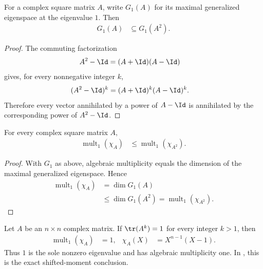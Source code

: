 \begin{lemma}
    \label{thm:mpu_generalized_eigenspace_one_square}
    \leanok
    For a complex square matrix $A$, write $G_1(A)$ for its maximal generalized
    eigenspace at the eigenvalue $1$. Then
    \begin{align}
        G_1(A) & \subseteq G_1(A^2).
    \end{align}
\end{lemma}

\begin{proof}\leanok
    The commuting factorization
    \begin{align}
        A^2-\Id & =(A+\Id)(A-\Id)
    \end{align}
    gives, for every nonnegative integer $k$,
    \begin{align}
        (A^2-\Id)^k & =(A+\Id)^k(A-\Id)^k.
    \end{align}
    Therefore every vector annihilated by a power of $A-\Id$ is annihilated by
    the corresponding power of $A^2-\Id$.
\end{proof}

\begin{lemma}
    \label{thm:mpu_root_multiplicity_one_square}
    \leanok
    For every complex square matrix $A$,
    \begin{align}
        \operatorname{mult}_{1}(\chi_A)
         & \le \operatorname{mult}_{1}(\chi_{A^2}).
    \end{align}
\end{lemma}

\begin{proof}\leanok
    With $G_1$ as above, algebraic multiplicity equals the dimension of the
    maximal generalized eigenspace. Hence
    \begin{align}
        \operatorname{mult}_{1}(\chi_A)
         & =\dim G_1(A)     \\
         & \le\dim G_1(A^2)
        =\operatorname{mult}_{1}(\chi_{A^2}).
    \end{align}
\end{proof}

\begin{lemma}
    \label{thm:mpu_shifted_trace_power_charpoly}
    \leanok
    Let $A$ be an $n\times n$ complex matrix. If $\tr(A^k)=1$ for every
    integer $k>1$, then
    \begin{align}
        \operatorname{mult}_{1}(\chi_A) & =1,
                                        & \chi_A(X) & =X^{n-1}(X-1).
    \end{align}
    Thus $1$ is the sole nonzero eigenvalue and has algebraic multiplicity one.
    In \cite[Proposition~III.1]{Cirac2017MPU}, this is the exact shifted-moment
    conclusion.
\end{lemma}

